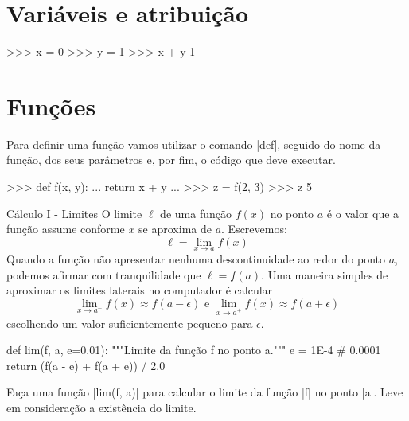 	

	\section*{Variáveis e atribuição}%
	\begin{lstpython}
	>>> x = 0
	>>> y = 1
	>>> x + y
	1
	\end{lstpython}

	\section*{Funções}%
	Para definir uma função vamos utilizar o comando |def|, seguido do nome da função, dos seus parâmetros e, por fim, o código que deve executar.
	\begin{lstpython}
	>>> def f(x, y):
	...		return x + y
	...
	>>> z = f(2, 3)
	>>> z
	5
	\end{lstpython}

    \begin{problem}[p:calculo:1]{Cálculo I - Limites}
	O limite $\ell$ de uma função $f(x)$ no ponto $a$ é o valor que a função assume conforme $x$ se aproxima de $a$. Escrevemos:
		$$\ell = \lim_{x \to a} f(x)$$
	Quando a função não apresentar nenhuma descontinuidade ao redor do ponto $a$, podemos afirmar com tranquilidade que $\ell = f(a)$. Uma maneira simples de aproximar os limites laterais no computador é calcular
		$$\lim_{x \to a^{-}}f(x) \approx f(a - \epsilon) \text{ e } \lim_{x \to a^{+}}f(x) \approx f(a + \epsilon)$$
	escolhendo um valor suficientemente pequeno para $\epsilon$. 

	\begin{lstpython}
	def lim(f, a, e=0.01):
		"""Limite da função f no ponto a."""
		e = 1E-4 # 0.0001
		return (f(a - e) + f(a + e)) / 2.0
	\end{lstpython}

	\proposal Faça uma função |lim(f, a)| para calcular o limite da função |f| no ponto |a|. Leve em consideração a existência do limite.
	\end{problem}

